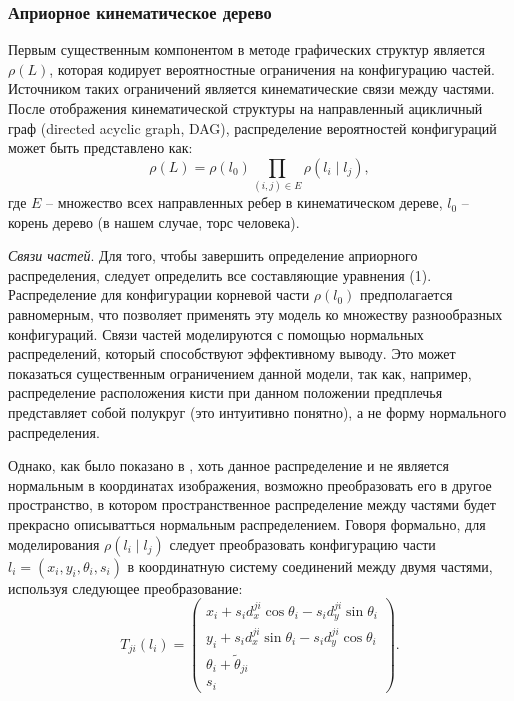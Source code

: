 \subsubsection{Априорное кинематическое дерево}

Первым существенным компонентом в методе графических структур является \(\rho(L)\), которая кодирует вероятностные ограничения на конфигурацию частей. Источником таких ограничений является кинематические связи между частями. После отображения кинематической структуры на направленный ацикличный граф (directed acyclic graph, DAG), распределение вероятностей конфигураций может быть представлено как:
\begin{equation}
  \rho(L) = \rho(l_0)\prod_{(i,j){\in}E}\rho(l_i{\mid}l_j),
\end{equation}
где \(E\) -- множество всех направленных ребер в кинематическом дереве, \(l_0\) -- корень дерево (в нашем случае, торс человека).

\emph{Связи частей}. Для того, чтобы завершить определение априорного распределения, следует определить все составляющие уравнения (1). Распределение для конфигурации корневой части \(\rho(l_0)\) предполагается равномерным, что позволяет применять эту модель ко множеству разнообразных конфигураций. Связи частей моделируются с помощью нормальных распределений, который способствуют эффективному выводу. Это может показаться существенным ограничением данной модели, так как, например, распределение расположения кисти при данном положении предплечья представляет собой полукруг (это интуитивно понятно), а не форму нормального распределения.

Однако, как было показано в \cite{felzenszwalb05}, хоть данное распределение и не является нормальным в координатах изображения, возможно преобразовать его в другое пространство, в котором пространственное распределение между частями будет прекрасно описыватться нормальным распределением. Говоря формально, для моделирования \(\rho(l_i{\mid}l_j)\) следует преобразовать конфигурацию части \(l_i = (x_i, y_i, \theta_i, s_i)\) в координатную систему соединений между двумя частями, используя следующее преобразование:
\begin{equation}
  T_{ji}(l_i) =
  \begin{pmatrix}
    x_i + s_id_x^{ji}\cos{\theta_i} - s_id_y^{ji}\sin{\theta_i}\\
    y_i + s_id_x^{ji}\sin{\theta_i} - s_id_y^{ji}\cos{\theta_i}\\
    \theta_i + \tilde{\theta}_{ji}\\
    s_i
  \end{pmatrix}.
\end{equation}

